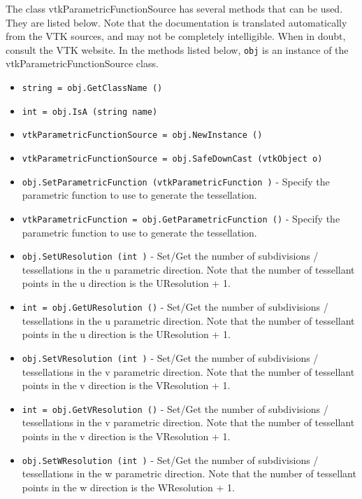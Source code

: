 The class vtkParametricFunctionSource has several methods that can be used.
  They are listed below.
Note that the documentation is translated automatically from the VTK sources,
and may not be completely intelligible.  When in doubt, consult the VTK website.
In the methods listed below, \verb|obj| is an instance of the vtkParametricFunctionSource class.
\begin{itemize}
\item  \verb|string = obj.GetClassName ()|

\item  \verb|int = obj.IsA (string name)|

\item  \verb|vtkParametricFunctionSource = obj.NewInstance ()|

\item  \verb|vtkParametricFunctionSource = obj.SafeDownCast (vtkObject o)|

\item  \verb|obj.SetParametricFunction (vtkParametricFunction )| -  Specify the parametric function to use to generate the tessellation.

\item  \verb|vtkParametricFunction = obj.GetParametricFunction ()| -  Specify the parametric function to use to generate the tessellation.

\item  \verb|obj.SetUResolution (int )| -  Set/Get the number of subdivisions / tessellations in the u parametric
 direction. Note that the number of tessellant points in the u 
 direction is the UResolution + 1.

\item  \verb|int = obj.GetUResolution ()| -  Set/Get the number of subdivisions / tessellations in the u parametric
 direction. Note that the number of tessellant points in the u 
 direction is the UResolution + 1.

\item  \verb|obj.SetVResolution (int )| -  Set/Get the number of subdivisions / tessellations in the v parametric
 direction. Note that the number of tessellant points in the v 
 direction is the VResolution + 1.

\item  \verb|int = obj.GetVResolution ()| -  Set/Get the number of subdivisions / tessellations in the v parametric
 direction. Note that the number of tessellant points in the v 
 direction is the VResolution + 1.

\item  \verb|obj.SetWResolution (int )| -  Set/Get the number of subdivisions / tessellations in the w parametric
 direction. Note that the number of tessellant points in the w 
 direction is the WResolution + 1.


\end{itemize}
